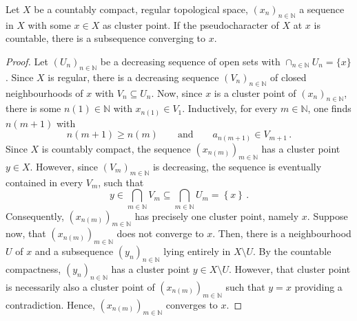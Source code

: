 \documentclass[10pt,a4paper]{amsart}
\begin{document}
\begin{lemma}
\label{lem:CountabilityAndPseudocharacter}
Let $X$ be a countably compact, regular topological space, $(x_n)_{n \in \mathbb{N}}$ a sequence in $X$ with some $x \in X$ as cluster point.
If the pseudocharacter of $X$ at $x$ is countable, there is a subsequence converging to $x$.
\end{lemma}

\begin{proof}
Let $(U_n)_{n \in \mathbb{N}}$ be a decreasing sequence of open sets with $\cap_{n \in \mathbb{N}} U_n = \{ x \}$.
Since $X$ is regular, there is a decreasing sequence $(V_n)_{n \in \mathbb{N}}$ of closed neighbourhoods of $x$ with $V_n \subseteq U_n$.
Now, since $x$ is a cluster point of $(x_n)_{n \in \mathbb{N}}$, there is some $n(1) \in \mathbb{N}$ with $x_{n(1)} \in V_1$.
Inductively, for every $m \in \mathbb{N}$, one finds $n(m+1)$ with
%
\begin{equation}
n \left( m + 1 \right) \ge n \left( m \right)
\qquad\text{and}\qquad
a_{n (m+1)} \in V_{m + 1} \, .
\end{equation}
%
Since $X$ is countably compact, the sequence $(x_{n(m)})_{m \in \mathbb{N}}$ has a cluster point $y \in X$.
However, since $(V_m)_{m \in \mathbb{N}}$ is decreasing, the sequence is eventually contained in every $V_m$, such that
%
\begin{equation}
y \in \bigcap_{m \in \mathbb{N}} V_m \subseteq \bigcap_{m \in \mathbb{N}} U_m = \left\{ x \right\} \, .
\end{equation}
%
Consequently, $(x_{n(m)})_{m \in \mathbb{N}}$ has precisely one cluster point, namely $x$.
Suppose now, that $(x_{n(m)})_{m \in \mathbb{N}}$ does not converge to $x$.
Then, there is a neighbourhood $U$ of $x$ and a subsequence $(y_n)_{n \in \mathbb{N}}$ lying entirely in $X \setminus U$.
By the countable compactness, $(y_n)_{n \in \mathbb{N}}$ has a cluster point $y \in X \setminus U$.
However, that cluster point is necessarily also a cluster point of $(x_{n(m)})_{m \in \mathbb{N}}$ such that $y = x$ providing a contradiction.
Hence, $(x_{n(m)})_{m \in \mathbb{N}}$ converges to $x$.
\end{proof}
\end{document}
